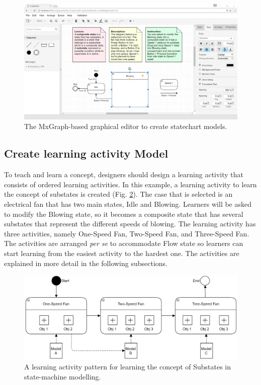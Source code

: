 \documentclass[conference]{IEEEtran}
\begin{document}
\begin{figure}[!t]
\centering
\includegraphics[width=\linewidth]{ide}
\caption{The MxGraph-based graphical editor to create statechart models.}
\label{ide}
\end{figure}

\subsection{Create learning activity Model}
To teach and learn a concept, designers should design a learning activity that consists of ordered learning activities. In this example, a learning activity to learn the concept of substates is created (Fig. \ref{eoml}). The case that is selected is an electrical fan that has two main states, Idle and Blowing. Learners will be asked to modify the Blowing state, so it becomes a composite state that has several substates that represent the different speeds of blowing. The learning activity has three activities, namely One-Speed Fan, Two-Speed Fan, and Three-Speed Fan. The activities are arranged \textit{per se} to accommodate Flow state \cite{csikszentmihalyi2014toward} so learners can start learning from the easiest activity to the hardest one. The activities are explained in more detail in the following subsections.
  
\begin{figure}[!t]
\centering
\includegraphics[width=\linewidth]{eoml}
\caption{A learning activity pattern for learning the concept of Substates in state-machine modelling.}
\label{eoml}
\end{figure}
\end{document}
